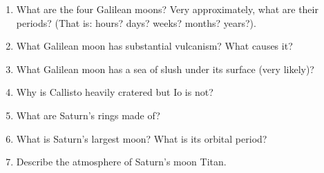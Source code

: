 
\begin{enumerate}
\item What are the four Galilean moons?  Very approximately, what are
  their periods? (That is: hours? days? weeks? months? years?).
\vspace{80pt}
\item What Galilean moon has substantial vulcanism? What causes it?
\vspace{80pt}
\item What Galilean moon has a sea of slush under its surface (very
  likely)?
\vspace{80pt}
\item Why is Callisto heavily cratered but Io is not?
\vspace{80pt}
\item What are Saturn's rings made of?
\vspace{80pt}
\item What is Saturn's largest moon?  What is its orbital period?
\vspace{80pt}
\item Describe the atmosphere of Saturn's moon Titan.
\vspace{80pt}
\end{enumerate}
